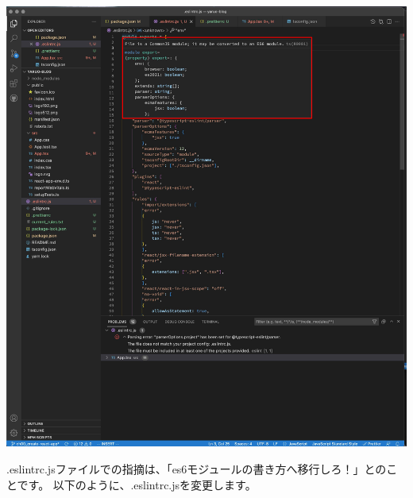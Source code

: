 \begin{reviewimage}%
\includegraphics[width=1.0\maxwidth]{./images/02-create-react-app/031_eslint_error.png}%
\label{image:02-create-react-app:031_eslint_error}
\end{reviewimage}

.eslintrc.jsファイルでの指摘は、「es6モジュールの書き方へ移行しろ！」とのことです。
以下のように、.eslintrc.jsを変更します。

